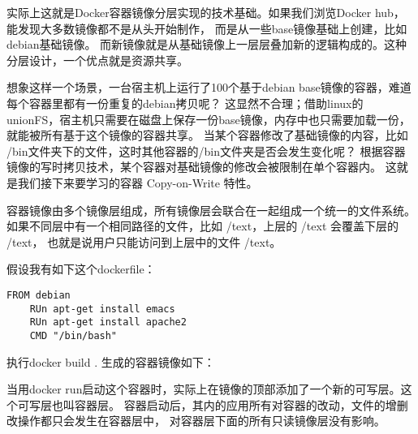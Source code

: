 实际上这就是Docker容器镜像分层实现的技术基础。如果我们浏览Docker hub，能发现大多数镜像都不是从头开始制作，
而是从一些base镜像基础上创建，比如debian基础镜像。
而新镜像就是从基础镜像上一层层叠加新的逻辑构成的。这种分层设计，一个优点就是资源共享。

想象这样一个场景，一台宿主机上运行了100个基于debian base镜像的容器，难道每个容器里都有一份重复的debian拷贝呢？
这显然不合理；借助linux的unionFS，宿主机只需要在磁盘上保存一份base镜像，内存中也只需要加载一份，
就能被所有基于这个镜像的容器共享。
当某个容器修改了基础镜像的内容，比如 /bin文件夹下的文件，这时其他容器的/bin文件夹是否会发生变化呢？
根据容器镜像的写时拷贝技术，某个容器对基础镜像的修改会被限制在单个容器内。
这就是我们接下来要学习的容器 Copy-on-Write 特性。

容器镜像由多个镜像层组成，所有镜像层会联合在一起组成一个统一的文件系统。
如果不同层中有一个相同路径的文件，比如 /text，上层的 /text 会覆盖下层的 /text，
也就是说用户只能访问到上层中的文件 /text。

假设我有如下这个dockerfile：

\begin{lstlisting}[frame=shadowbox]
    FROM debian
    RUn apt-get install emacs
    RUn apt-get install apache2
    CMD "/bin/bash"
\end{lstlisting}

执行docker build .
生成的容器镜像如下：

当用docker run启动这个容器时，实际上在镜像的顶部添加了一个新的可写层。这个可写层也叫容器层。
容器启动后，其内的应用所有对容器的改动，文件的增删改操作都只会发生在容器层中，
对容器层下面的所有只读镜像层没有影响。

\newpage

